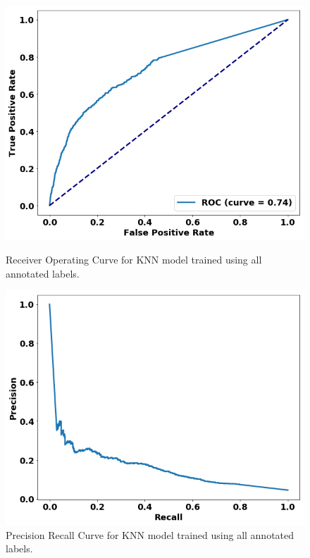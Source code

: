 \begin{figure}
\centering
\begin{minipage}[b]{.4\textwidth}
\includegraphics[trim=0in 0.1in 0.1in 0.in,clip,width=1.0\textwidth]{figures/roc_all_gensim.png}
\caption{Receiver Operating Curve for KNN model trained using all annotated labels.}\label{fig:all_rocs}
\end{minipage}\qquad
\begin{minipage}[b]{.4\textwidth}
\includegraphics[trim=0in 0.1in 0.1in 0.in,clip,width=1.0\textwidth]{figures/prc_all_gensim.png}
\caption{Precision Recall Curve for KNN model trained using all annotated labels.}\label{fig:all_prcs}
\end{minipage}
\end{figure}


